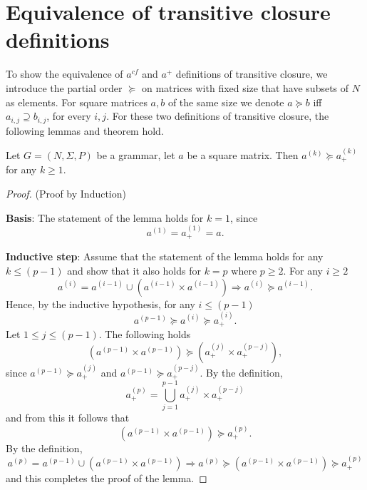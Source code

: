 \appendix

\section{Equivalence of transitive closure definitions}\label{def_eq}

To show the equivalence of $a^{cf}$ and $a^+$ definitions of transitive closure, we introduce the partial order $\succeq$ on matrices with fixed size that have subsets of $N$ as elements. For square matrices $a, b$ of the same size we denote $a \succeq b$ iff $a_{i,j} \supseteq b_{i,j}$, for every $i, j$. For these two definitions of transitive closure, the following lemmas and theorem hold.

\begin{lemma}\label{lemma:cf_geq_valiant}
	Let $G =(N,\Sigma,P)$ be a grammar, let $a$ be a square matrix. Then $a^{(k)} \succeq a^{(k)}_+$ for any $k \geq 1$.
\end{lemma}
\begin{proof}(Proof by Induction)
	
	\textbf{Basis}: The statement of the lemma holds for $k = 1$, since $$a^{(1)} = a^{(1)}_+ = a.$$
	
	\textbf{Inductive step}: Assume that the statement of the lemma holds for any $k \leq (p - 1)$ and show that it also holds for $k = p$ where $p \geq 2$. For any $i \geq 2$ $$a^{(i)} = a^{(i-1)} \cup (a^{(i-1)} \times a^{(i-1)}) \Rightarrow a^{(i)} \succeq a^{(i-1)}.$$ Hence, by the inductive hypothesis, for any $i \leq (p-1)$ $$a^{(p-1)} \succeq a^{(i)} \succeq a^{(i)}_+.$$ Let $1 \leq j \leq (p - 1)$. The following holds $$(a^{(p-1)} \times a^{(p-1)}) \succeq (a^{(j)}_+ \times a^{(p-j)}_+),$$ since $a^{(p-1)} \succeq a^{(j)}_+$ and $a^{(p-1)} \succeq a^{(p-j)}_+$. By the definition, $$a^{(p)}_+ = \bigcup^{p-1}_{j=1}{a^{(j)}_+ \times a^{(p-j)}_+}$$ and from this it follows that $$(a^{(p-1)} \times a^{(p-1)}) \succeq a^{(p)}_+.$$ By the definition, $$a^{(p)} = a^{(p-1)} \cup (a^{(p-1)} \times a^{(p-1)}) \Rightarrow a^{(p)} \succeq (a^{(p-1)} \times a^{(p-1)}) \succeq a^{(p)}_+$$ and this completes the proof of the lemma.
\end{proof}

